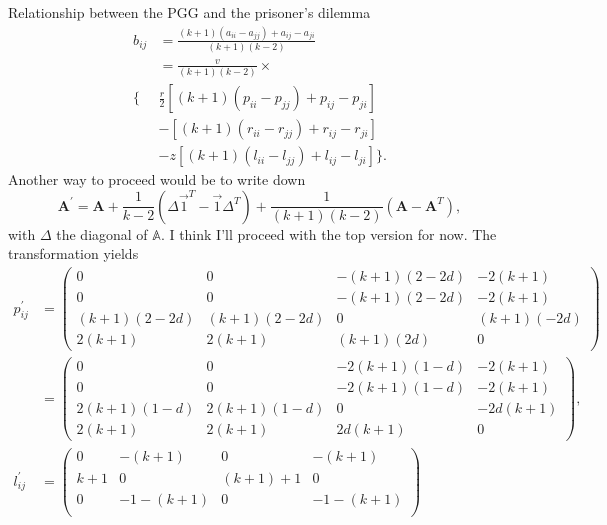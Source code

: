 \documentclass[13pt]{amsart}
\begin{document}
\begin{section}{Relationship between the PGG and the prisoner's dilemma}
\begin{equation}
    \begin{split}
        b_{ij} & = \frac{(k+1)(a_{ii} - a_{jj}) + a_{ij} - a_{ji}}{(k+1)(k-2)}
        \\
        & = \frac{v}{(k+1)(k-2)} \times
        \\
        \Big\{ & \frac{r}{2} [(k+1)(p_{ii} - p_{jj}) + p_{ij} - p_{ji}]
        \\
        & - [(k+1)(r_{ii} - r_{jj}) + r_{ij} - r_{ji}]
        \\
        & - z[(k+1)(l_{ii} - l_{jj}) + l_{ij} - l_{ji}] \Big\}.
    \end{split}
    \label{eq:b_transform}
\end{equation}
Another way to proceed would be to write down
\begin{equation}
    \mathbf{A}^\prime = \mathbf{A} + \frac{1}{k-2} (\Delta \vec{1}^T - \vec{1} \Delta^T) + \frac{1}{(k+1)(k-2)}(\mathbf{A} - \mathbf{A}^T),
\end{equation}
with $\Delta$ the diagonal of $\mathbb{A}$.
I think I'll proceed with the top version for now.
The transformation yields
\begin{equation}
    \begin{split}
        p^\prime_{ij} &=
        \begin{pmatrix}
            0 & 0 & -(k+1)(2 - 2d) & -2(k+1) \\
            0 & 0 & -(k+1)(2 - 2d) & -2(k+1) \\
            (k+1)(2 - 2d) & (k+1)(2 - 2d) & 0 & (k+1)(- 2d) \\
            2(k+1) & 2(k+1) & (k+1)(2d) & 0
        \end{pmatrix}
        \\
        & =
        \begin{pmatrix}
            0 & 0 & -2(k+1)(1-d) & -2(k+1) \\
            0 & 0 & -2(k+1)(1-d) & -2(k+1) \\
            2(k+1)(1-d) & 2(k+1)(1-d) & 0 & -2d(k+1) \\
            2(k+1) & 2(k+1) & 2d(k+1) & 0
        \end{pmatrix},
        \\
        l^\prime_{ij} & =
        \begin{pmatrix}
            0 & -(k+1) & 0 & -(k+1) \\
            k+1 & 0 & (k+1) + 1 & 0 \\
            0 & -1 - (k+1) & 0 & -1 - (k+1) \\

\end{pmatrix}
\end{split}
\end{equation}
\end{section}
\end{document}
